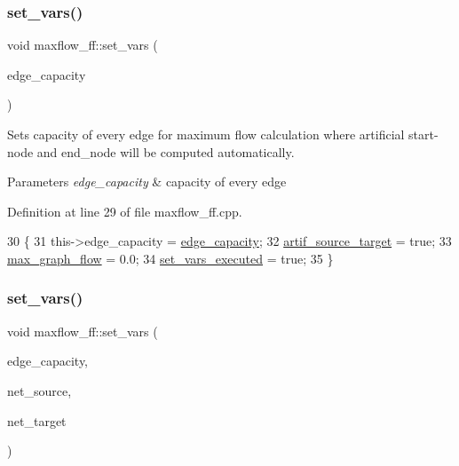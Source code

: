 \subsubsection{\texorpdfstring{set\+\_\+vars()}{set\_vars()}\hspace{0.1cm}{\footnotesize\ttfamily [1/2]}}
{\footnotesize\ttfamily void maxflow\+\_\+ff\+::set\+\_\+vars (\begin{DoxyParamCaption}\item[{const \mbox{\hyperlink{classedge__map}{edge\+\_\+map}}$<$ double $>$ \&}]{edge\+\_\+capacity }\end{DoxyParamCaption})}

Sets capacity of every edge for maximum flow calculation where artificial start-\/node and end\+\_\+node will be computed automatically.


\begin{DoxyParams}{Parameters}
{\em edge\+\_\+capacity} & capacity of every edge \\
\hline
\end{DoxyParams}


Definition at line 29 of file maxflow\+\_\+ff.\+cpp.


\begin{DoxyCode}
30 \{
31     this->edge\_capacity = \mbox{\hyperlink{classmaxflow__ff_a5b38943e093c77a57eb70f1a4190b8a6}{edge\_capacity}};
32     \mbox{\hyperlink{classmaxflow__ff_a1ec31e7053722875a2e90659f79396a3}{artif\_source\_target}} = \textcolor{keyword}{true};
33     \mbox{\hyperlink{classmaxflow__ff_a7a2f530f9c95b6f37f4c349427a0f9bb}{max\_graph\_flow}} = 0.0;
34     \mbox{\hyperlink{classmaxflow__ff_a2551a00303d9b81ccc6b3d1f575d7956}{set\_vars\_executed}} = \textcolor{keyword}{true};
35 \}
\end{DoxyCode}
\mbox{\label{classmaxflow__ff_a1e715030d70080e0c9ecf118dd81e8f6}} 
\subsubsection{\texorpdfstring{set\+\_\+vars()}{set\_vars()}\hspace{0.1cm}{\footnotesize\ttfamily [2/2]}}
{\footnotesize\ttfamily void maxflow\+\_\+ff\+::set\+\_\+vars (\begin{DoxyParamCaption}\item[{const \mbox{\hyperlink{classedge__map}{edge\+\_\+map}}$<$ double $>$ \&}]{edge\+\_\+capacity,  }\item[{const \mbox{\hyperlink{classnode}{node}} \&}]{net\+\_\+source,  }\item[{const \mbox{\hyperlink{classnode}{node}} \&}]{net\+\_\+target }\end{DoxyParamCaption})}

